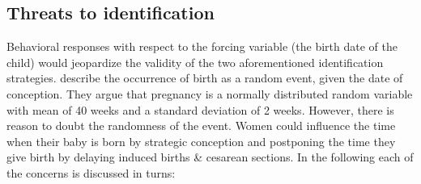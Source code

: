 \documentclass[a4paper ]{article}
\begin{document}
\subsection{Threats to identification}\label{sec:threats indentification}
Behavioral responses with respect to the forcing variable (the birth date of the child) would jeopardize the validity of the two aforementioned identification strategies. \cite{ekberg2013parental} describe the occurrence of birth as a random event, given the date of conception. They argue that pregnancy is a normally distributed random variable with mean of 40 weeks and a standard deviation of 2 weeks. However, there is reason to doubt the randomness of the event. \newline 
Women could influence the time when their baby is born by strategic conception and postponing the time they give birth by delaying induced births \& cesarean sections. In the following each of the concerns is discussed in turns: 
\end{document}
